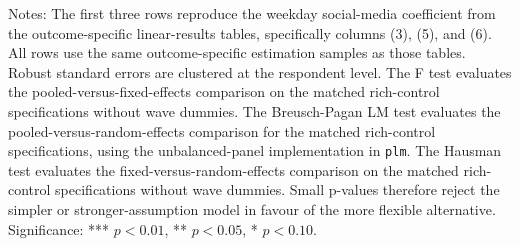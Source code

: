 \begin{table}[!htbp]
\centering
\caption{Panel-model comparison and specification tests}
\label{tab:panel_model_tests}
\scriptsize
{}
\begin{minipage}{0.95\textwidth}
\footnotesize Notes: The first three rows reproduce the weekday social-media coefficient from the outcome-specific linear-results tables, specifically columns (3), (5), and (6). All rows use the same outcome-specific estimation samples as those tables. Robust standard errors are clustered at the respondent level. The F test evaluates the pooled-versus-fixed-effects comparison on the matched rich-control specifications without wave dummies. The Breusch-Pagan LM test evaluates the pooled-versus-random-effects comparison for the matched rich-control specifications, using the unbalanced-panel implementation in \texttt{plm}. The Hausman test evaluates the fixed-versus-random-effects comparison on the matched rich-control specifications without wave dummies. Small p-values therefore reject the simpler or stronger-assumption model in favour of the more flexible alternative. Significance: *** \(p < 0.01\), ** \(p < 0.05\), * \(p < 0.10\).
\end{minipage}
\end{table}
